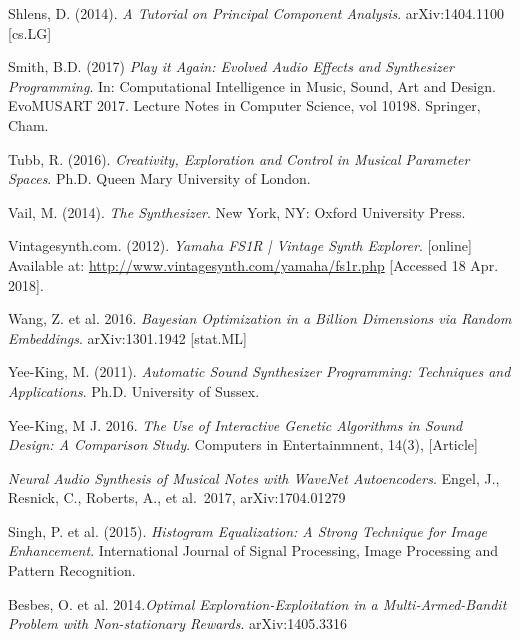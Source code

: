 \documentclass[11pt, oneside]{report}   	%
\begin{document}
\begin{thebibliography}{9}
Shlens, D. (2014). \emph{A Tutorial on Principal Component Analysis}. arXiv:1404.1100 [cs.LG]


Smith, B.D. (2017) \emph{Play it Again: Evolved Audio Effects and Synthesizer Programming}. In: Computational Intelligence in Music, Sound, Art and Design. EvoMUSART 2017. Lecture Notes in Computer Science, vol 10198. Springer, Cham.

Tubb, R. (2016). \emph{Creativity, Exploration and Control in Musical Parameter Spaces}. Ph.D. Queen Mary University of London.

Vail, M. (2014). \emph{The Synthesizer}. New York, NY: Oxford University Press.

Vintagesynth.com. (2012). \emph{Yamaha FS1R | Vintage Synth Explorer}. [online] Available at: \url{http://www.vintagesynth.com/yamaha/fs1r.php} [Accessed 18 Apr. 2018].

Wang, Z. et al. 2016. \emph{Bayesian Optimization in a Billion Dimensions via Random Embeddings}. arXiv:1301.1942 [stat.ML]

Yee-King, M. (2011). \emph{Automatic Sound Synthesizer Programming: Techniques and Applications}. Ph.D. University of Sussex.

Yee-King, M J. 2016. \emph{The Use of Interactive Genetic Algorithms in Sound Design: A Comparison Study}. Computers in Entertainmnent, 14(3), [Article]

 \emph{Neural Audio Synthesis of Musical Notes with WaveNet Autoencoders}. Engel, J., Resnick, C., Roberts, A., et al.\ 2017, arXiv:1704.01279 

Singh, P. et al. (2015). \emph{Histogram Equalization: A Strong Technique for Image Enhancement}. International Journal of Signal Processing, Image Processing and Pattern Recognition. %

Besbes, O. et al. 2014.\emph{Optimal Exploration-Exploitation in a Multi-Armed-Bandit Problem with Non-stationary Rewards}.	arXiv:1405.3316

\end{thebibliography}
\end{document}
